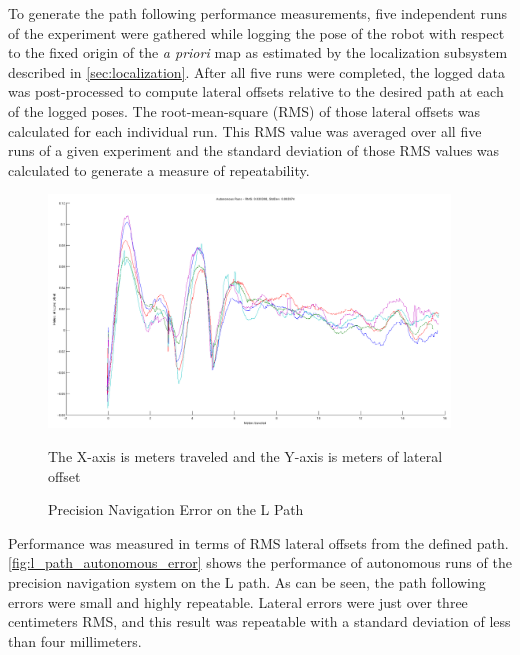 To generate the path following performance measurements, five independent runs of the experiment were gathered while logging the pose of the robot with respect to the fixed origin of the \emph{a priori} map as estimated by the localization subsystem described in \autoref{sec:localization}. After all five runs were completed, the logged data was post-processed to compute lateral offsets relative to the desired path at each of the logged poses. The root-mean-square (RMS) of those lateral offsets was calculated for each individual run. This RMS value was averaged over all five runs of a given experiment and the standard deviation of those RMS values was calculated to generate a measure of repeatability.

\begin{figure}
\centering
\includegraphics[width=0.95\textwidth]{images/l_path_autonomous_error}
\caption{Precision Navigation Error on the L Path \label{fig:l_path_autonomous_error}}{The X-axis is meters traveled and the Y-axis is meters of lateral offset}
\end{figure}

Performance was measured in terms of RMS lateral offsets from the defined path. \autoref{fig:l_path_autonomous_error} shows the performance of autonomous runs of the precision navigation system on the L path. As can be seen, the path following errors were small and highly repeatable. Lateral errors were just over three centimeters RMS, and this result was repeatable with a standard deviation of less than four millimeters.

